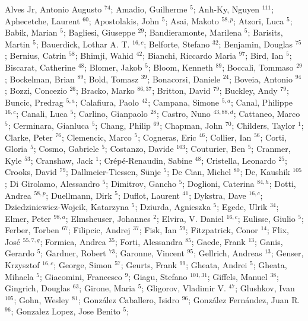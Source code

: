 Alves Jr, Antonio Augusto $^{74}$;
Amadio, Guilherme $^{5}$;
Anh-Ky, Nguyen $^{111}$;
Aphecetche, Laurent $^{60}$;
Apostolakis, John $^{5}$;
Asai, Makoto $^{58,p}$;
Atzori, Luca $^{5}$;
Babik, Marian $^{5}$;
Bagliesi, Giuseppe $^{29}$;
Bandieramonte, Marilena $^{5}$;
Barisits, Martin $^{5}$;
Bauerdick, Lothar A. T. $^{16,c}$;
Belforte, Stefano $^{32}$;
Benjamin, Douglas $^{75}$;
Bernius, Catrin $^{58}$;
Bhimji, Wahid $^{42}$;
Bianchi, Riccardo Maria $^{97}$;
Bird, Ian $^{5}$;
Biscarat, Catherine $^{48}$;
Blomer, Jakob $^{5}$;
Bloom, Kenneth $^{89}$;
Boccali, Tommaso $^{29}$;
Bockelman, Brian $^{89}$;
Bold, Tomasz $^{39}$;
Bonacorsi, Daniele $^{24}$;
Boveia, Antonio $^{94}$;
Bozzi, Concezio $^{26}$;
Bracko, Marko $^{86,37}$;
Britton, David $^{79}$;
Buckley, Andy $^{79}$;
Buncic, Predrag $^{5,a}$;
Calafiura, Paolo $^{42}$;
Campana, Simone $^{5,a}$;
Canal, Philippe $^{16,c}$;
Canali, Luca $^{5}$;
Carlino, Gianpaolo $^{28}$;
Castro, Nuno $^{43,88,d}$;
Cattaneo, Marco $^{5}$;
Cerminara, Gianluca $^{5}$;
Chang, Philip $^{69}$;
Chapman, John $^{70}$;
Childers, Taylor $^{1}$;
Clarke, Peter $^{76}$;
Clemencic, Marco $^{5}$;
Cogneras, Eric $^{46}$;
Collier, Ian $^{56}$;
Corti, Gloria $^{5}$;
Cosmo, Gabriele $^{5}$;
Costanzo, Davide $^{103}$;
Couturier, Ben $^{5}$;
Cranmer, Kyle $^{53}$;
Cranshaw, Jack $^{1}$;
Crépé-Renaudin, Sabine $^{48}$;
Cristella, Leonardo $^{25}$;
Crooks, David $^{79}$;
Dallmeier-Tiessen, Sünje $^{5}$;
De Cian, Michel $^{80}$;
De, Kaushik $^{105}$;
Di Girolamo, Alessandro $^{5}$;
Dimitrov, Gancho $^{5}$;
Doglioni, Caterina $^{84,h}$;
Dotti, Andrea $^{58,p}$;
Duellmann, Dirk $^{5}$;
Duflot, Laurent $^{41}$;
Dykstra, Dave $^{16,c}$;
Dziedziniewicz-Wojcik, Katarzyna $^{5}$;
Dziurda, Agnieszka $^{5}$;
Egede, Ulrik $^{34}$;
Elmer, Peter $^{98,a}$;
Elmsheuser, Johannes $^{2}$;
Elvira, V. Daniel $^{16,c}$;
Eulisse, Giulio $^{5}$;
Ferber, Torben $^{67}$;
Filipcic, Andrej $^{37}$;
Fisk, Ian $^{59}$;
Fitzpatrick, Conor $^{14}$;
Flix, José $^{55,7,g}$;
Formica, Andrea $^{35}$;
Forti, Alessandra $^{85}$;
Gaede, Frank $^{13}$;
Ganis, Gerardo $^{5}$;
Gardner, Robert $^{73}$;
Garonne, Vincent $^{95}$;
Gellrich, Andreas $^{13}$;
Genser, Krzysztof $^{16,c}$;
George, Simon $^{57}$;
Geurts, Frank $^{99}$;
Gheata, Andrei $^{5}$;
Gheata, Mihaela $^{5}$;
Giacomini, Francesco $^{9}$;
Giagu, Stefano $^{101,31}$;
Giffels, Manuel $^{38}$;
Gingrich, Douglas $^{63}$;
Girone, Maria $^{5}$;
Gligorov, Vladimir V. $^{47}$;
Glushkov, Ivan $^{105}$;
Gohn, Wesley $^{81}$;
González Caballero, Isidro $^{96}$;
González Fernández, Juan R. $^{96}$;
Gonzalez Lopez, Jose Benito $^{5}$;
